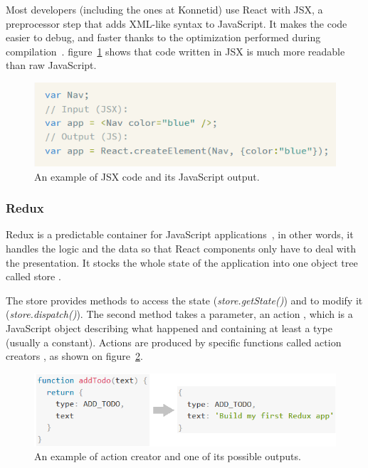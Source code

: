 Most developers (including the ones at Konnetid) use React with JSX, a preprocessor step that adds XML-like syntax to JavaScript.
It makes the code easier to debug, and faster thanks to the optimization performed during compilation~\cite{whyJsx}. {\sc figure}~\ref{fig:jsx} shows that code written in JSX is much more readable than raw JavaScript.

\begin{figure}[H]
    \centering
    \includegraphics[scale=0.9]{figure/jsx.png}
    \caption{An example of JSX code and its JavaScript output.}
    \label{fig:jsx}
\end{figure}

\subsubsection{Redux}
\label{sssec:redux}

Redux is a predictable container for JavaScript applications~\cite{reduxDoc}, in other words, it handles the logic and the data so that React components only have to deal with the presentation. It stocks the whole state of the application into one object tree called \guillemotleft{} store \guillemotright{}. 

The store provides methods to access the state (\textit{store.getState()}) and to modify it (\textit{store.dispatch()}). The second method takes a parameter, an \guillemotleft{} action \guillemotright{}, which is a JavaScript object describing what happened and containing at least a type (usually a constant). Actions are produced by specific functions called \guillemotleft{} action creators \guillemotright{}, as shown on {\sc figure}~\ref{fig:action}.

\begin{figure}[H]
    \centering
    \includegraphics[scale=0.9]{figure/action.png}
    \caption{An example of action creator and one of its possible outputs.}
    \label{fig:action}
\end{figure}

